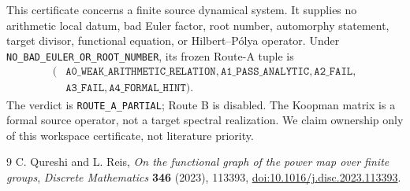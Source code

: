 \documentclass[10pt]{article}
\begin{document}
This certificate concerns a finite source dynamical system.  It supplies no
arithmetic local datum, bad Euler factor, root number, automorphy statement,
target divisor, functional equation, or Hilbert--P\'olya operator.  Under
\texttt{NO\_BAD\_EULER\_OR\_ROOT\_NUMBER}, its frozen Route-A tuple is
\[
\begin{split}
(&\texttt{A0\_WEAK\_ARITHMETIC\_RELATION},
\texttt{A1\_PASS\_ANALYTIC},\texttt{A2\_FAIL},\\
&\texttt{A3\_FAIL},\texttt{A4\_FORMAL\_HINT}).
\end{split}
\]
The verdict is \texttt{ROUTE\_A\_PARTIAL}; Route B is disabled.  The Koopman
matrix is a formal source operator, not a target spectral realization.  We
claim ownership only of this workspace certificate, not literature priority.
\fi

\begin{thebibliography}{9}
 C. Qureshi and L. Reis,
\emph{On the functional graph of the power map over finite groups},
\emph{Discrete Mathematics} \textbf{346} (2023), 113393,
\href{https://doi.org/10.1016/j.disc.2023.113393}{doi:10.1016/j.disc.2023.113393}.
\end{thebibliography}
\end{document}
